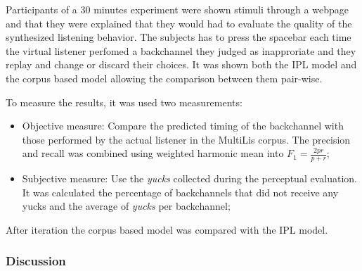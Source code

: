 Participants of a 30 minutes experiment were shown stimuli through a webpage and that they were explained that they would had to evaluate the quality of the synthesized listening behavior. The subjects has to press the spacebar each time the virtual listener perfomed a backchannel they judged as inapproriate and they replay and change or discard their choices. It was shown both the IPL model and the corpus based model allowing the comparison between them pair-wise.


To measure the results, it was used two measurements:
\begin{itemize}
	\item Objective measure: Compare the predicted timing of the backchannel with those performed by the actual listener in the MultiLis corpus. The precision and recall was combined using weighted harmonic mean into $F_{1} = \frac{2pr}{p+r}$;
	\item Subjective measure: Use the \textit{yucks} collected during the perceptual evaluation. It was calculated the percentage of backchannels that did not receive any yucks and the average of \textit{yucks} per backchannel;
\end{itemize}

After iteration the corpus based model was compared with the \ac{IPL} model.  

\subsubsection*{Discussion}